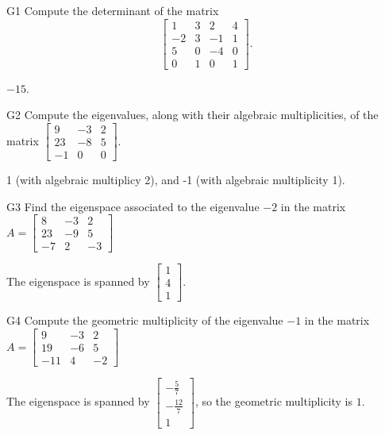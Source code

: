 \documentclass{sbgLAsemi}
\begin{document}
\begin{problem}{G1}
Compute the determinant of the matrix
\[
  \begin{bmatrix}
    1 & 3 & 2 & 4 \\
    -2 & 3 & -1 & 1 \\
    5 & 0 & -4 & 0 \\
    0 & 1 & 0 & 1
  \end{bmatrix}
.\]
\end{problem}
\begin{solution}
\(-15\).
\end{solution}

\begin{problem}{G2}
Compute the eigenvalues, along with their algebraic multiplicities, of the matrix $ \begin{bmatrix} 9 & -3 & 2 \\ 23 & -8 & 5 \\  -1 & 0 & 0 \end{bmatrix}$.
\end{problem}
\begin{solution}
1 (with algebraic multiplicy 2), and -1 (with algebraic multiplicity 1).
\end{solution}

\begin{problem}{G3}
Find the eigenspace associated to the eigenvalue $-2$ in the matrix $A=\begin{bmatrix}8 & -3 & 2 \\ 23 & -9 & 5 \\ -7 & 2 & -3\end{bmatrix}$
\end{problem}
\begin{solution}
The eigenspace is spanned by $\begin{bmatrix} 1 \\ 4 \\ 1 \end{bmatrix}$.
\end{solution}

\begin{problem}{G4}
Compute the geometric multiplicity of the eigenvalue $-1$ in the matrix $A=\begin{bmatrix}9 & -3 & 2 \\ 19 & -6 & 5 \\ -11 & 4 & -2 \end{bmatrix}$
\end{problem}
\begin{solution}
The eigenspace is spanned by $\begin{bmatrix} -\frac{5}{7} \\ - \frac{12}{7} \\ 1 \end{bmatrix}$, so the geometric multiplicity is $1$.
\end{solution}
\end{document}
